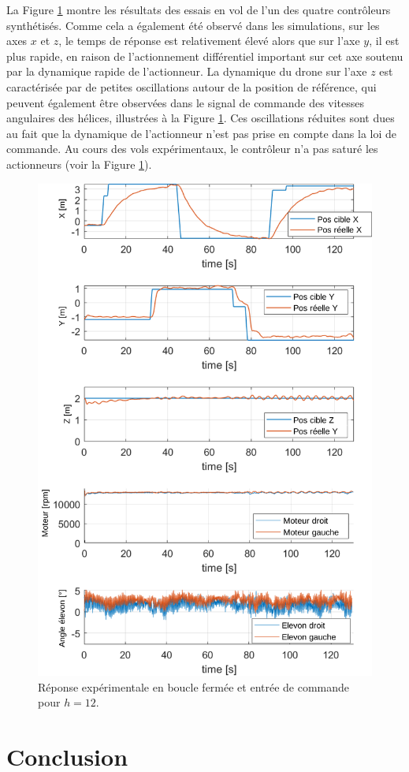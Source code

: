 La Figure \ref{Dabbene_Flight_Test} montre les résultats des essais en vol de l'un des quatre contrôleurs synthétisés. 
Comme cela a également été observé dans les simulations, sur les axes $x$ et $z$, le temps de réponse est relativement élevé alors que sur l'axe $y$, il est plus rapide, en raison de l'actionnement différentiel important sur cet axe soutenu par la dynamique rapide de l'actionneur. La dynamique du drone sur l'axe $z$ est caractérisée par de petites oscillations autour de la position de référence, qui peuvent également être observées dans le signal de commande des vitesses angulaires des hélices, illustrées à la Figure \ref{Dabbene_Flight_Test}. Ces oscillations réduites sont dues au fait que la dynamique de l'actionneur n'est pas prise en compte dans la loi de commande.
Au cours des vols expérimentaux, le contrôleur n'a pas saturé les actionneurs (voir la Figure \ref{Dabbene_Flight_Test}).
\vfill 

\newpage
\begin{figure}[H]
    \centering
    \includegraphics[width=0.55\columnwidth]{figures/realflight_z_adjust_x_adjust_final_HopeCrop.png}
    \caption{Réponse expérimentale en boucle fermée et entrée de commande pour $h = 12$.}
    \label{Dabbene_Flight_Test}
\end{figure}



\section{Conclusion}

